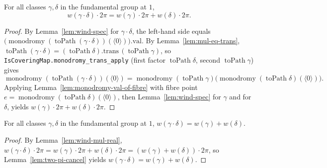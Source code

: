 \begin{lemma}
    \label{lem:wind-mul-real}
    \leanok
    For all classes \(\gamma, \delta\) in the fundamental group at \(1\),
    \[
      w(\gamma\cdot\delta)\cdot 2\pi = w(\gamma)\cdot 2\pi + w(\delta)\cdot 2\pi .
    \]
\end{lemma}
\begin{proof}
    By Lemma~\ref{lem:wind-spec} for \(\gamma\cdot\delta\), the left-hand side equals
    \(\bigl(\operatorname{monodromy}(\operatorname{toPath}(\gamma\cdot\delta))(\langle 0\rangle)\bigr).\mathrm{val}\).
    By Lemma~\ref{lem:mul-eq-trans}, \(\operatorname{toPath}(\gamma\cdot\delta)
      = (\operatorname{toPath}\delta).\mathrm{trans}\,(\operatorname{toPath}\gamma)\), so
    \texttt{IsCoveringMap.monodromy\_trans\_apply} (first factor \(\operatorname{toPath}\delta\), second
    \(\operatorname{toPath}\gamma\)) gives
    \[
      \operatorname{monodromy}(\operatorname{toPath}(\gamma\cdot\delta))(\langle 0\rangle)
        = \operatorname{monodromy}(\operatorname{toPath}\gamma)
            \bigl(\operatorname{monodromy}(\operatorname{toPath}\delta)(\langle 0\rangle)\bigr).
    \]
    Applying Lemma~\ref{lem:monodromy-val-of-fibre} with fibre point
    \(e = \operatorname{monodromy}(\operatorname{toPath}\delta)(\langle 0\rangle)\), then
    Lemma~\ref{lem:wind-spec} for \(\gamma\) and for \(\delta\), yields
    \(w(\gamma)\cdot 2\pi + w(\delta)\cdot 2\pi\).
\end{proof}

\begin{lemma}
    \label{lem:wind-mul}
    \leanok
    For all classes \(\gamma, \delta\) in the fundamental group at \(1\),
    \(w(\gamma \cdot \delta) = w(\gamma) + w(\delta)\).
\end{lemma}
\begin{proof}
    By Lemma~\ref{lem:wind-mul-real},
    \(w(\gamma\cdot\delta)\cdot 2\pi = w(\gamma)\cdot 2\pi + w(\delta)\cdot 2\pi
      = (w(\gamma) + w(\delta))\cdot 2\pi\), so Lemma~\ref{lem:two-pi-cancel} yields
    \(w(\gamma\cdot\delta) = w(\gamma) + w(\delta)\).
\end{proof}

